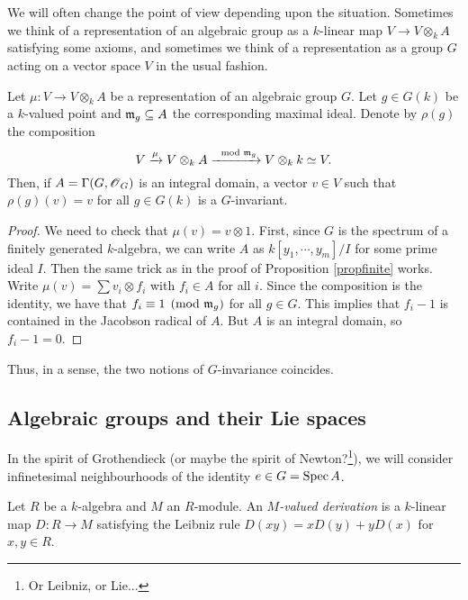\documentclass[11pt, english]{article}
\begin{document}
We will often change the point of view depending upon the situation. Sometimes we think of a representation of an algebraic group as a $k$-linear map $V \to V \otimes_k A$ satisfying some axioms, and sometimes we think of a representation as a group $G$ acting on a vector space $V$ in the usual fashion.

\begin{prop}
 Let $\mu: V \to V \otimes_k A$ be a representation of an algebraic group $G$. Let $g \in G(k)$ be a $k$-valued point and $\mathfrak{m}_g \subseteq A$ the corresponding maximal ideal. Denote by $\rho(g)$ the composition
\[
V \xrightarrow{\mu} V \otimes_k A \xrightarrow {\mod {\mathfrak{m}}_g} V \otimes_k k \simeq V.
\]
Then, if $A=\Gamma(G,\operatorname{\mathscr{O}}_G)$ is an integral domain, a vector $v \in V$ such that $\rho(g)(v)=v$ for all $g \in G(k)$ is a $G$-invariant.
\end{prop}
\begin{proof}
We need to check that $\mu(v)=v \otimes 1$.  First, since $G$ is the spectrum of a finitely generated $k$-algebra, we can write $A$ as $k[y_1,\cdots,y_m]/I$ for some prime ideal $I$. Then the same trick as in the proof of Proposition \ref{propfinite} works. Write $\mu(v)=\sum v_i \otimes f_i$ with $f_i \in A$ for all $i$. Since the composition is the identity, we have that $f_i \equiv 1 \pmod{\mathfrak{m}_g}$ for all $g \in G$. This implies that $f_i-1$ is contained in the Jacobson radical of $A$. But $A$ is an integral domain, so $f_i-1=0$.
\end{proof}
Thus, in a sense, the two notions of $G$-invariance coincides.

\subsection{Algebraic groups and their Lie spaces}

In the spirit of Grothendieck (or maybe the spirit of Newton?\footnote{Or Leibniz, or Lie...}), we will consider infinetesimal neighbourhoods of the identity $e \in G=\operatorname{Spec} A$.

\begin{defi}
 Let $R$ be a $k$-algebra and $M$ an $R$-module. An \emph{$M$-valued derivation} is a $k$-linear map $D:R \to M$ satisfying the Leibniz rule $D(xy)=xD(y) + yD(x)$ for $x,y \in R$.
\end{defi}
\end{document}
